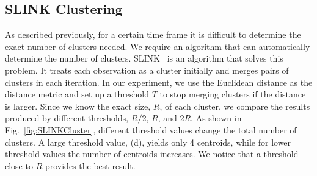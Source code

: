 \documentclass[12pt]{article}
\begin{document}
\subsection{SLINK Clustering}
\label{sec:SLINK}
As described previously, for a certain time frame it is difficult to determine the exact number of clusters needed. We require an algorithm that can automatically determine the number of clusters. SLINK~\cite{sibson1973slink} is an algorithm that solves this problem. It treats each observation as a cluster initially and merges pairs of clusters in each iteration. In our experiment, we use the Euclidean distance as the distance metric and set up a threshold $T$ to stop merging clusters if the distance is larger. Since we know the exact size, $R$, of each cluster, we compare the results produced by different thresholds, $R/2$, $R$, and $2R$.  As shown in Fig.~\ref{fig:SLINKCluster}, different threshold values change the total number of clusters. A large threshold value, (d), yields only 4 centroids, while for lower threshold values the number of centroids increases. We notice that a threshold close to $R$ provides the best result.
\end{document}
